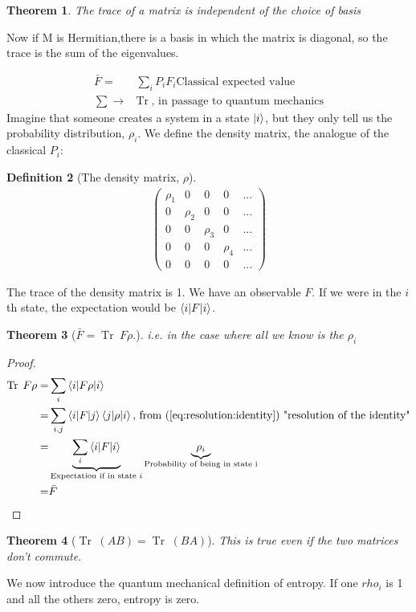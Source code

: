 \documentclass[]{article}
\newtheorem{thm}{Theorem}
\newtheorem{defn}[thm]{Definition}
\DeclareMathOperator{\Tr}{Tr \;}
\begin{document}
\begin{thm}The trace of a matrix is independent of the choice of basis
\end{thm}

Now if M is Hermitian,there is a basis in which the matrix is diagonal, so the trace is the sum of the eigenvalues.

\begin{align*}
	\bar{F} =& \sum_i P_i F_i \text{Classical expected value}\\
	\sum \rightarrow& \Tr \text{, in passage to quantum mechanics}
\end{align*}
Imagine that someone creates a system in a state $\ket{i}$, but they only tell us the probability distribution, $\rho_i$. We define the density matrix, the analogue of the classical $P_i$:
\begin{defn}[The density matrix, $\rho$]
	\begin{align*}
		\begin{pmatrix}
			\rho_1&0&0&0&...\\
			0&\rho_2&0&0&...\\
			0&0&\rho_3&0&...\\
			0&0&0&\rho_4&...\\
			0&0&0&0&...
		\end{pmatrix}
	\end{align*}
\end{defn}
The trace of the density matrix is 1.
We have an observable $F$. If we were in the $i$th state, the expectation would be $\braket{i\vert F \vert i}$.
\begin{thm}[$\bar{F}= \Tr F \rho$.]
	i.e. in the case where all we know is the $\rho_i$
\end{thm}
\begin{proof}
	\begin{align*}
		\Tr F \rho=&\sum_i \braket{i \vert F \rho \vert i}\\
		=& \sum_{i,j} \braket{i \vert F \vert j} \braket{j \vert \rho \vert i} \text{, from (\ref{eq:resolution:identity}) "resolution of the identity"}\\
		=& \underbrace{\sum_i \braket{i \vert F \vert i}}_\text{Expectation if in state $i$} \underbrace{\rho_i}_\text{Probability of being in state i}\\
		=& \bar{F}
	\end{align*}
\end{proof}

\begin{thm}[$\Tr(AB)=\Tr(BA)$]This is true even if the two matrices don't commute.
\end{thm}
We now introduce the quantum mechanical definition of entropy. If one $rho_i$ is 1 and all the others zero, entropy is zero.
\end{document}
